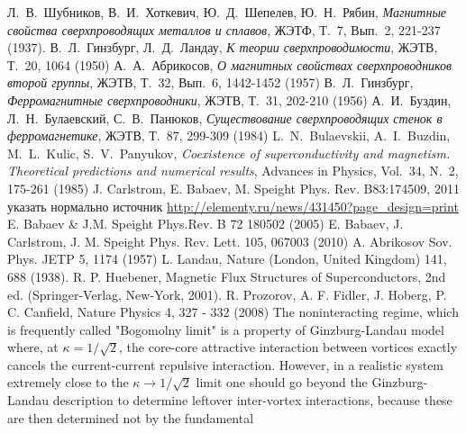 \def\bibname{СПИСОК ИСПОЛЬЗОВАННЫХ ИСТОЧНИКОВ}
\begin{thebibliography}{99}
	\newcommand{\tabfix}{\hspace*{1.25cm}}
	 Л.~В.~Шубников, В.~И.~Хоткевич, Ю.~Д.~Шепелев, 
        Ю.~Н.~Рябин, \textit{Магнитные свойства сверхпроводящих металлов и 
        сплавов}, ЖЭТФ, Т.~7, Вып.~2, 221-237 (1937).
     В.~Л.~Гинзбург, Л.~Д.~Ландау, \textit{К теории 
        сверхпроводимости}, ЖЭТВ, Т.~20, 1064 (1950)
     А.~А.~Абрикосов, \textit{О магнитных свойствах 
        сверхпроводников второй группы}, ЖЭТВ, Т.~32, Вып.~6, 1442-1452 (1957)
     В.~Л.~Гинзбург, \textit{Ферромагнитные 
        сверхпроводники}, ЖЭТВ, Т.~31, 202-210 (1956)
     А.~И.~Буздин, Л.~Н.~Булаевский, С.~В.~Панюков, 
        \textit{Существование сверхпроводящих стенок в ферромагнетике}, 
        ЖЭТВ, Т.~87, 299-309 (1984)
     L.~N.~Bulaevskii, A.~I.~Buzdin, M.~L.~Kulic, 
        S.~V.~Panyukov, \textit{Coexistence of superconductivity and 
        magnetism. Theoretical predictions and numerical results}, Advances in 
        Physics, Vol.~34, N.~2, 175-261 (1985)
     J. Carlstrom, E. Babaev, M. Speight Phys. Rev. 
        B83:174509, 2011
     указать нормально источник 
        \url{http://elementy.ru/news/431450?page_design=print}
     E. Babaev \& J.M. Speight Phys.Rev. B 72 180502 (2005)
     E. Babaev, J. Carlstrom, J. M. Speight Phys. Rev. Lett. 
        105, 067003 (2010)
     A. Abrikosov Sov. Phys. JETP 5, 1174 (1957)
     L. Landau, Nature (London, United Kingdom) 141, 688 
        (1938). R. P. Huebener, Magnetic Flux Structures of Superconductors, 
        2nd ed. (Springer-Verlag, New-York, 2001). R. Prozorov, A. F. Fidler, 
        J. Hoberg, P. C. Canfield, Nature Physics 4, 327 - 332 (2008)
     The noninteracting regime, which is frequently called 
        "Bogomolny limit" is a property of Ginzburg-Landau model where, at 
        \( \kappa = 1/\sqrt{2} \), the core-core attractive interaction 
        between vortices exactly cancels the current-current repulsive 
        interaction. However, in a realistic system extremely close to the 
        \( \kappa \to 1/\sqrt{2} \) limit one should go beyond the 
        Ginzburg-Landau description to determine leftover inter-vortex 
        interactions, because these are then determined not by the fundamental 

\end{thebibliography}
